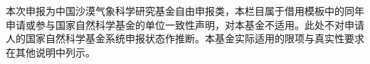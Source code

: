\justifying
\NSFCBodyText

本次申报为中国沙漠气象科学研究基金自由申报类，本栏目属于借用模板中的同年申请或参与国家自然科学基金的单位一致性声明，对本基金不适用。此处不对申请人的国家自然科学基金系统申报状态作推断。本基金实际适用的限项与真实性要求在其他说明中列示。
